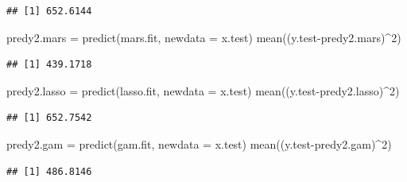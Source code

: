 \documentclass[
]{article}
\newenvironment{Shaded}{\begin{snugshade}}{\end{snugshade}}
\newcommand{\AttributeTok}[1]{\textcolor[rgb]{0.77,0.63,0.00}{#1}}
\newcommand{\DecValTok}[1]{\textcolor[rgb]{0.00,0.00,0.81}{#1}}
\newcommand{\FunctionTok}[1]{\textcolor[rgb]{0.00,0.00,0.00}{#1}}
\newcommand{\NormalTok}[1]{#1}
\newcommand{\OtherTok}[1]{\textcolor[rgb]{0.56,0.35,0.01}{#1}}
\newcommand{\SpecialCharTok}[1]{\textcolor[rgb]{0.00,0.00,0.00}{#1}}
\begin{document}
\begin{verbatim}
## [1] 652.6144
\end{verbatim}

\begin{Shaded}
\begin{Highlighting}[]
\NormalTok{predy2.mars }\OtherTok{=} \FunctionTok{predict}\NormalTok{(mars.fit, }\AttributeTok{newdata =}\NormalTok{ x.test)}
\FunctionTok{mean}\NormalTok{((y.test}\SpecialCharTok{{-}}\NormalTok{predy2.mars)}\SpecialCharTok{\^{}}\DecValTok{2}\NormalTok{)}
\end{Highlighting}
\end{Shaded}

\begin{verbatim}
## [1] 439.1718
\end{verbatim}

\begin{Shaded}
\begin{Highlighting}[]
\NormalTok{predy2.lasso }\OtherTok{=} \FunctionTok{predict}\NormalTok{(lasso.fit, }\AttributeTok{newdata =}\NormalTok{ x.test)}
\FunctionTok{mean}\NormalTok{((y.test}\SpecialCharTok{{-}}\NormalTok{predy2.lasso)}\SpecialCharTok{\^{}}\DecValTok{2}\NormalTok{)}
\end{Highlighting}
\end{Shaded}

\begin{verbatim}
## [1] 652.7542
\end{verbatim}

\begin{Shaded}
\begin{Highlighting}[]
\NormalTok{predy2.gam }\OtherTok{=} \FunctionTok{predict}\NormalTok{(gam.fit, }\AttributeTok{newdata =}\NormalTok{ x.test)}
\FunctionTok{mean}\NormalTok{((y.test}\SpecialCharTok{{-}}\NormalTok{predy2.gam)}\SpecialCharTok{\^{}}\DecValTok{2}\NormalTok{)}
\end{Highlighting}
\end{Shaded}

\begin{verbatim}
## [1] 486.8146
\end{verbatim}
\end{document}
